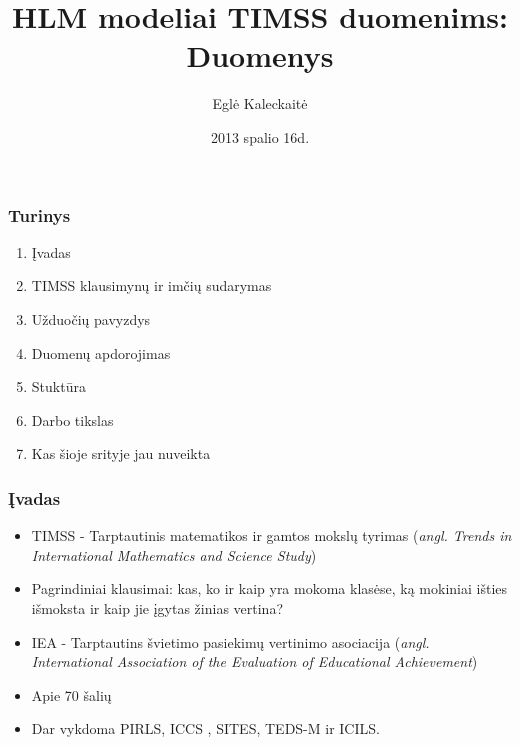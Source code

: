 \documentclass[utf8,hyperref={unicode,pdftex}]{beamer}
\title[\hspace{130pt} p. \insertpagenumber\enspace iš \insertdocumentendpage\enspace ]{HLM modeliai TIMSS duomenims:\\ Duomenys}
\author[ E. Kaleckaitė]{Eglė Kaleckaitė}
\institute{Vilniaus Universitetas, Matematikos ir Informatikos Fakultetas}
\date{2013 spalio 16d.}
\begin{document}
\begin{frame}
\titlepage
\end{frame}
\begin{frame}
\frametitle{Turinys}
\Large
\begin{enumerate}
\item Įvadas
\item TIMSS klausimynų ir imčių sudarymas
\item Užduočių pavyzdys
\item Duomenų apdorojimas
\item Stuktūra
\item Darbo tikslas
\item Kas šioje srityje jau nuveikta
\end{enumerate}
\end{frame}
\begin{frame}
\frametitle{Įvadas}
\begin{itemize}
\item TIMSS - Tarptautinis matematikos ir gamtos mokslų tyrimas (\textit{angl. Trends in International Mathematics and Science Study})
\item Pagrindiniai klausimai: kas, ko ir kaip yra mokoma klasėse, ką mokiniai išties išmoksta ir kaip jie įgytas žinias vertina?
\item IEA - Tarptautins švietimo pasiekimų vertinimo asociacija (\textit{angl. International Association of the Evaluation of Educational Achievement})
\item Apie 70 šalių
\item Dar vykdoma PIRLS, ICCS , SITES, TEDS-M ir ICILS.
\end{itemize}
\end{frame}
\end{document}

